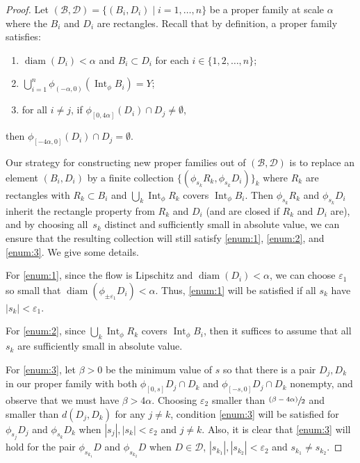\documentclass[10pt]{amsart}
\let\mathcal\mathscr
\let\epsilon\varepsilon
\let\sep\mid
\newcommand{\psfrac}[2]{\sfrac{(#1)}{#2}}
\theoremstyle{definition}
\numberwithin{equation}{section}
\DeclareMathOperator{\diam}{diam}
\DeclareMathOperator{\Int}{Int}
\newcommand\DDD{\mathcal D}
\newcommand\BBB{\mathcal B}
\begin{document}
\begin{proof}
Let $(\mathcal{B},\mathcal{D})= \{(B_i, D_i) \sep i = 1, \ldots, n \}$ be a proper family at scale $\alpha$ where the $B_i$ and $D_i$ are rectangles. Recall that by definition, a proper family satisfies:
\begin{enumerate}
\item\label{enum:1}
$\diam (D_i)< \alpha$ and $B_i \subset D_i$ for each $i \in \{1, 2, \ldots, n\}$;
\item\label{enum:2}
$\bigcup_{i=1}^n\phi_{(-\alpha, 0)} (\Int_\phi B_i)=Y$;
\item\label{enum:3}
for all $i\neq j$, if $\phi_{[0, 4\alpha]}(D_i) \cap D_j \neq \emptyset$, 
\end{enumerate}
then $\phi_{[-4\alpha, 0]}(D_i) \cap D_j = \emptyset$.

Our strategy for constructing new proper families out of $(\BBB, \DDD)$ is to replace an element $(B_i, D_i)$ by a finite collection $\{ (\phi_{s_k}R_k, \phi_{s_k}D_i) \}_k$ where $R_k$ are rectangles with $R_k \subset B_i$ and $\bigcup_k \Int_\phi R_k$ covers $\Int_\phi B_i$. Then $\phi_{s_k}R_k$ and $\phi_{s_k}D_i$ inherit the rectangle property from $R_k$ and $D_i$ (and are closed if $R_k$ and $D_i$ are), and by choosing all~$s_k$ distinct and sufficiently small in absolute value, we can ensure that the resulting collection will still satisfy \eqref{enum:1}, \eqref{enum:2}, and \eqref{enum:3}. We give some details.

For \eqref{enum:1}, since the flow is Lipschitz and $\diam(D_{i})<\alpha$, we can choose $\epsilon_1$ so small that $\diam(\phi_{\pm\epsilon_1}D_{i})<\alpha$. Thus, \eqref{enum:1} will be satisfied if all $s_k$ have $|s_k| < \epsilon_1$.

For \eqref{enum:2}, since $\bigcup_k \Int_\phi R_k$ covers $\Int_\phi B_i$, then it suffices to assume that all $s_k$ are sufficiently small in absolute value.

For \eqref{enum:3}, let $\beta>0$ be the minimum value of $s$ so that there is a pair $D_j, D_k$ in our proper family with both $\phi_{[0,s]} D_j \cap D_k$ and $\phi_{[-s,0]} D_j \cap D_k$ nonempty, and observe that we must have $\beta>4\alpha$. Choosing $\epsilon_2$ smaller than $\psfrac{\beta-4\alpha}{2}$ and smaller than $d(D_j, D_k)$ for any $j\neq k$, condition \eqref{enum:3} will be satisfied for $\phi_{s_j} D_j$ and $\phi_{s_k}D_k$ when $|s_j|, |s_k| < \epsilon_2$ and $j\neq k$. Also, it is clear that \eqref{enum:3} will hold for the pair $\phi_{s_{k_1}} D$ and $\phi_{s_{k_2}}D$ when $D \in \DDD$, $|s_{k_1}|, |s_{k_2}| < \epsilon_2$ and $s_{k_1} \neq s_{k_2}$.


\end{proof}
\end{document}
